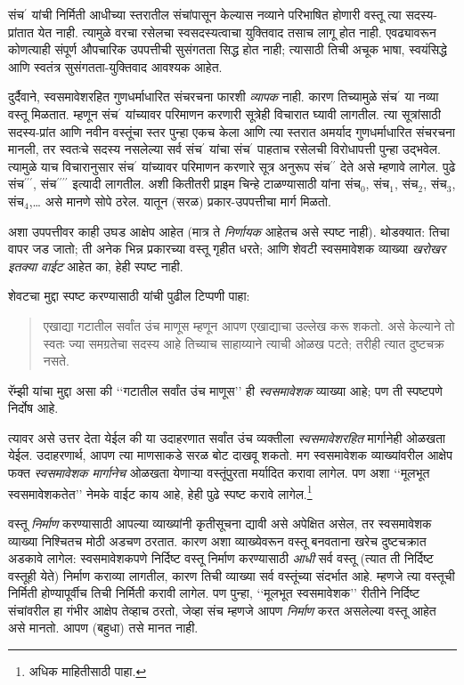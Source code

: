 \documentclass[../../../include/open-logic-section]{subfiles}
\begin{document}
संच$^{\prime}$ यांची निर्मिती आधीच्या स्तरातील संचांपासून
केल्यास नव्याने परिभाषित होणारी वस्तू त्या सदस्य-प्रांतात येत नाही.
त्यामुळे वरचा रसेलचा स्वसदस्यत्वाचा युक्तिवाद तसाच लागू होत नाही.
एवढ्यावरून कोणत्याही संपूर्ण औपचारिक उपपत्तीची
सुसंगतता सिद्ध होत नाही; त्यासाठी तिची अचूक भाषा,
स्वयंसिद्धे आणि स्वतंत्र सुसंगतता-युक्तिवाद आवश्यक आहेत.

दुर्दैवाने,
स्वसमावेशरहित
गुणधर्माधारित
संचरचना फारशी
\emph{व्यापक}
नाही. कारण
तिच्यामुळे
संच$^\prime$
या नव्या
वस्तू मिळतात.
म्हणून संच$^\prime$
यांच्यावर
परिमाणन करणारी
सूत्रेही विचारात
घ्यावी लागतील.
त्या सूत्रांसाठी सदस्य-प्रांत आणि नवीन वस्तूंचा स्तर
पुन्हा एकच केला आणि त्या स्तरात अमर्याद गुणधर्माधारित
संचरचना मानली, तर स्वतःचे
सदस्य नसलेल्या
सर्व संच$^\prime$
यांचा संच$^\prime$
पाहताच रसेलची
विरोधापत्ती
पुन्हा उद्भवेल.
त्यामुळे याच
विचारानुसार
संच$^\prime$
यांच्यावर
परिमाणन करणारे
सूत्र अनुरूप
संच$^{\prime\prime}$
देते असे
म्हणावे लागेल.
पुढे
संच$^{\prime\prime\prime}$,
संच$^{\prime\prime\prime\prime}$
इत्यादी लागतील.
अशी कितीतरी
प्राइम चिन्हे
टाळण्यासाठी
यांना संच$_0$,
संच$_1$,
संच$_2$,
संच$_3$,
संच$_4$,\ldots
असे मानणे
सोपे ठरेल.
यातून (सरळ)
प्रकार-उपपत्तीचा
मार्ग मिळतो.

अशा उपपत्तीवर
काही उघड
आक्षेप आहेत
(मात्र ते
\emph{निर्णायक}
आहेतच असे
स्पष्ट नाही).
थोडक्यात:
तिचा वापर
जड जातो;
ती अनेक
भिन्न प्रकारच्या
वस्तू गृहीत
धरते; आणि
शेवटी
स्वसमावेशक
व्याख्या
\emph{खरोखर
इतक्या वाईट}
आहेत का,
हेही स्पष्ट
नाही.

शेवटचा मुद्दा
स्पष्ट करण्यासाठी
\citeauthor{Ramsey1925}
यांची पुढील
टिप्पणी पाहा:
\begin{quote}
  एखाद्या
  गटातील
  सर्वांत
  उंच माणूस
  म्हणून आपण
  एखाद्याचा
  उल्लेख करू
  शकतो. असे
  केल्याने तो
  स्वतः ज्या
  समग्रतेचा
  सदस्य आहे
  तिच्याच
  साहाय्याने
  त्याची ओळख
  पटते; तरीही
  त्यात दुष्टचक्र
  नसते.
  \citep{Ramsey1925}
\end{quote}
रॅम्झी यांचा
मुद्दा असा
की ‘‘गटातील
सर्वांत उंच
माणूस’’ ही
\emph{स्वसमावेशक}
व्याख्या आहे;
पण ती
स्पष्टपणे
निर्दोष आहे.

त्यावर असे
उत्तर देता
येईल की
या उदाहरणात
सर्वांत उंच
व्यक्तीला
\emph{स्वसमावेशरहित}
मार्गानेही
ओळखता येईल.
उदाहरणार्थ,
आपण त्या
माणसाकडे
सरळ बोट
दाखवू
शकतो. मग
स्वसमावेशक
व्याख्यांवरील
आक्षेप फक्त
\emph{स्वसमावेशक
मार्गानेच}
ओळखता येणाऱ्या
वस्तूंपुरता
मर्यादित करावा
लागेल. पण
अशा
‘‘मूलभूत
स्वसमावेशकतेत’’
नेमके वाईट
काय आहे,
हेही पुढे
स्पष्ट करावे
लागेल.\footnote{
  अधिक माहितीसाठी
  \citet{Linnebo2010}
  पाहा.}

वस्तू
\emph{निर्माण}
करण्यासाठी
आपल्या
व्याख्यांनी
कृतीसूचना
द्यावी असे
अपेक्षित
असेल, तर
स्वसमावेशक
व्याख्या
निश्चितच
मोठी अडचण
ठरतात.
कारण अशा
व्याख्येवरून
वस्तू बनवताना
खरेच
दुष्टचक्रात
अडकावे
लागेल:
स्वसमावेशकपणे
निर्दिष्ट
वस्तू निर्माण
करण्यासाठी
\emph{आधी} सर्व
वस्तू
(त्यात ती
निर्दिष्ट
वस्तूही येते)
निर्माण कराव्या
लागतील,
कारण तिची
व्याख्या
सर्व वस्तूंच्या
संदर्भात आहे.
म्हणजे त्या
वस्तूची
निर्मिती
होण्यापूर्वीच
तिची निर्मिती
करावी लागेल.
पण पुन्हा,
‘‘मूलभूत
स्वसमावेशक’’
रीतीने
निर्दिष्ट
संचांवरील
हा गंभीर
आक्षेप
तेव्हाच
ठरतो,
जेव्हा
संच म्हणजे
आपण
\emph{निर्माण}
करत असलेल्या
वस्तू आहेत
असे मानतो.
आपण
(बहुधा)
तसे मानत
नाही.
\end{document}
